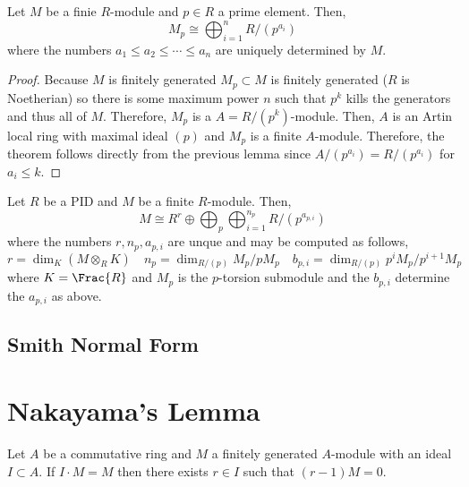 \documentclass[12pt]{article}
\begin{document}
\begin{prop}
Let $M$ be a finie $R$-module and $p \in R$ a prime element. Then,
\[ M_p \cong \bigoplus_{i = 1}^n R / (p^{a_i}) \]
where the numbers $a_1 \le a_2 \le \cdots \le a_n$ are uniquely determined by $M$. 
\end{prop}


\begin{proof}
Because $M$ is finitely generated $M_p \subset M$ is finitely generated ($R$ is Noetherian) so there is some maximum power $n$ such that $p^k$ kills the generators and thus all of $M$. Therefore, $M_p$ is a $A = R/(p^k)$-module. Then, $A$ is an Artin local ring with maximal ideal $(p)$ and $M_p$ is a finite $A$-module. Therefore, the theorem follows directly from the previous lemma since $A / (p^{a_i}) = R / (p^{a_i})$ for $a_i \le k$.
\end{proof}

\begin{theorem}
Let $R$ be a PID and $M$ be a finite $R$-module. Then,
\[ M \cong R^r \oplus \bigoplus_{p} \bigoplus_{i = 1}^{n_p} R / (p^{a_{p,i}}) \]
where the numbers $r, n_p, a_{p,i}$ are unque and may be computed as follows,
\[ r = \dim_K (M \otimes_R K) \quad n_p = \dim_{R/(p)} M_p/p M_p \quad b_{p,i} = \dim_{R/(p)} p^i M_p / p^{i+1} M_p \]
where $K = \Frac{R}$ and $M_p$ is the $p$-torsion submodule and the $b_{p,i}$ determine the $a_{p,i}$ as above.
\end{theorem}


\subsection{Smith Normal Form}

\begin{prop}

\end{prop}




\section{Nakayama's Lemma}

\begin{prop}
Let $A$ be a commutative ring and $M$ a finitely generated $A$-module with an ideal $I \subset A$. If $I \cdot M = M$ then there exists $r \in I$ such that $(r - 1) M = 0$.
\end{prop}
\end{document}
